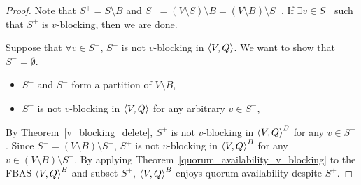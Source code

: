 \documentclass[12pt, psamsfonts]{amsart}
\theoremstyle{definition}
\theoremstyle{remark}
\numberwithin{equation}{subsection}
\begin{document}
\begin{proof}
    Note that $S^{+} = S \setminus B$ and $S^{-} = (V \setminus S) \setminus B = (V \setminus B) \setminus S^{+}$.
    If $\exists v \in S^{-}$ such that $S^{+}$ is $v$-blocking, then we are done.

    Suppose that $\forall v \in S^{-}$, $S^{+}$ is not $v$-blocking in $\ev{V, Q}$.
    We want to show that $S^{-} = \emptyset$.

    \begin{itemize}
        \item
            $S^{+}$ and $S^{-}$ form a partition of $V \setminus B$,
        \item
            $S^{+}$ is not $v$-blocking in $\ev{V, Q}$ for any arbitrary $v \in S^{-}$,
    \end{itemize}
    By Theorem~\ref{v_blocking_delete}, $S^{+}$ is not $v$-blocking in $\ev{V, Q}^B$ for any $v \in S^{-}$.
    Since $S^{-} = (V \setminus B) \setminus S^{+}$, $S^{+}$ is not $v$-blocking in $\ev{V, Q}^B$ for any $v \in (V \setminus B) \setminus S^{+}$.
    By applying Theorem~\ref{quorum_availability_v_blocking} to the FBAS $\ev{V, Q}^B$ and subset $S^{+}$, $\ev{V, Q}^B$ enjoys quorum availability despite $S^{+}$.


\end{proof}
\end{document}
